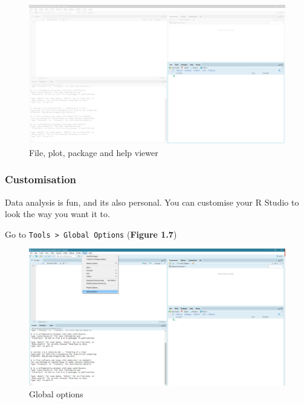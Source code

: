 \documentclass[
]{book}
\begin{document}
\begin{figure}

{\centering \includegraphics{images/02_install/rstud06} 

}

\caption{File, plot, package and help viewer}\label{fig:unnamed-chunk-11}
\end{figure}

\hypertarget{customisation}{%
\subsubsection{Customisation}\label{customisation}}

Data analysis is fun, and its also personal. You can customise your R Studio to look the way you want it to.

Go to \texttt{Tools\ \textgreater{}\ Global\ Options} (\textbf{Figure 1.7})

\begin{figure}

{\centering \includegraphics{images/02_install/rstud07} 

}

\caption{Global options}\label{fig:unnamed-chunk-12}
\end{figure}
\end{document}
